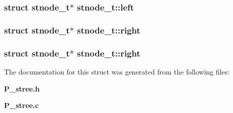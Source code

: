 \subsubsection{\setlength{\rightskip}{0pt plus 5cm}struct stnode\_\-t$\ast$ stnode\_\-t::left}\label{structstnode__t_m1}


\subsubsection{\setlength{\rightskip}{0pt plus 5cm}struct stnode\_\-t$\ast$ stnode\_\-t::right}\label{structstnode__t_m5}


\subsubsection{\setlength{\rightskip}{0pt plus 5cm}struct stnode\_\-t$\ast$ stnode\_\-t::right}\label{structstnode__t_m2}




The documentation for this struct was generated from the following files:\begin{CompactItemize}
\item 
{\bf P\_\-stree.h}\item 
{\bf P\_\-stree.c}\end{CompactItemize}
